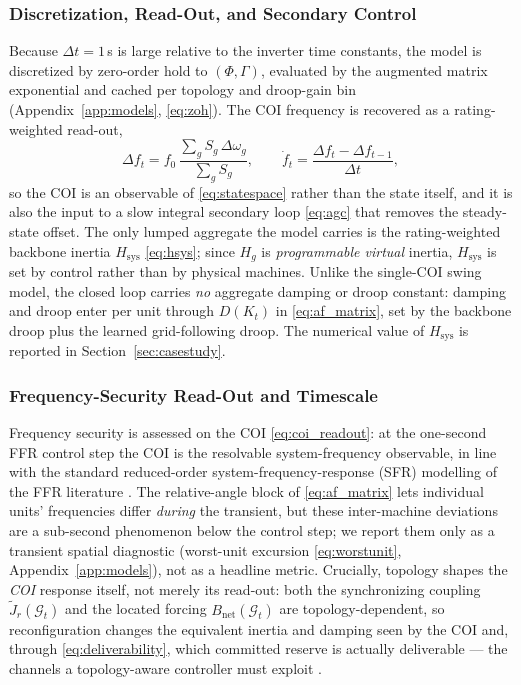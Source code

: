 \documentclass[lettersize,journal]{IEEEtran}
\begin{document}
\subsubsection{Discretization, Read-Out, and Secondary Control}
Because $\Delta t=1$\,s is large relative to the inverter time constants, the model is discretized by zero-order hold to $(\Phi,\Gamma)$, evaluated by the augmented matrix exponential and cached per topology and droop-gain bin (Appendix~\ref{app:models}, \eqref{eq:zoh}). The COI frequency is recovered as a rating-weighted read-out,
\begin{equation}
  \Delta f_t = f_0\,\frac{\sum_g S_g\,\Delta\omega_g}{\sum_g S_g},
  \qquad
  \dot f_t = \frac{\Delta f_t-\Delta f_{t-1}}{\Delta t},
  \label{eq:coi_readout}
\end{equation}
so the COI is an observable of \eqref{eq:statespace} rather than the state itself, and it is also the input to a slow integral secondary loop \eqref{eq:agc} that removes the steady-state offset. The only lumped aggregate the model carries is the rating-weighted backbone inertia $H_{\mathrm{sys}}$ \eqref{eq:hsys}; since $H_g$ is \emph{programmable virtual} inertia, $H_{\mathrm{sys}}$ is set by control rather than by physical machines. Unlike the single-COI swing model, the closed loop carries \emph{no} aggregate damping or droop constant: damping and droop enter per unit through $D(K_t)$ in \eqref{eq:af_matrix}, set by the backbone droop plus the learned grid-following droop. The numerical value of $H_{\mathrm{sys}}$ is reported in Section~\ref{sec:casestudy}.

\subsubsection{Frequency-Security Read-Out and Timescale}
Frequency security is assessed on the COI \eqref{eq:coi_readout}: at the one-second FFR control step the COI is the resolvable system-frequency observable, in line with the standard reduced-order system-frequency-response (SFR) modelling of the FFR literature \cite{anderson1990sfr}. The relative-angle block of \eqref{eq:af_matrix} lets individual units' frequencies differ \emph{during} the transient, but these inter-machine deviations are a sub-second phenomenon below the control step; we report them only as a transient spatial diagnostic (worst-unit excursion \eqref{eq:worstunit}, Appendix~\ref{app:models}), not as a headline metric. Crucially, topology shapes the \emph{COI} response itself, not merely its read-out: both the synchronizing coupling $\tilde{J}_r(\mathcal{G}_t)$ and the located forcing $B_{\mathrm{net}}(\mathcal{G}_t)$ are topology-dependent, so reconfiguration changes the equivalent inertia and damping seen by the COI and, through \eqref{eq:deliverability}, which committed reserve is actually deliverable --- the channels a topology-aware controller must exploit \cite{fradley2020network}.
\end{document}
